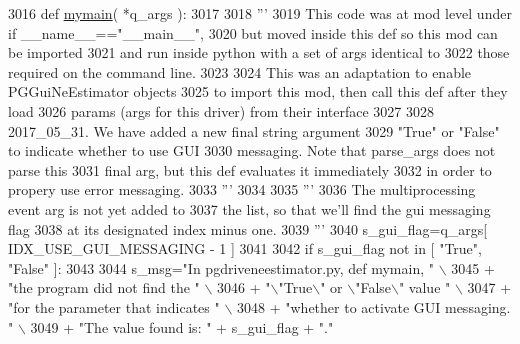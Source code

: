 \begin{DoxyCode}
3016 \textcolor{keyword}{def }\hyperlink{namespacenegui_1_1pgdriveneestimator_a8344146a59d84da02da349abd68723ad}{mymain}( *q\_args ):
3017 
3018     \textcolor{stringliteral}{'''}
3019 \textcolor{stringliteral}{    This code was at mod level under if \_\_name\_\_=="\_\_main\_\_",}
3020 \textcolor{stringliteral}{    but moved inside this def so this mod can be imported}
3021 \textcolor{stringliteral}{    and run inside python with a set of args identical to}
3022 \textcolor{stringliteral}{    those required on the command line.}
3023 \textcolor{stringliteral}{}
3024 \textcolor{stringliteral}{    This was an adaptation to enable PGGuiNeEstimator objects}
3025 \textcolor{stringliteral}{    to import this mod, then call this def after they load }
3026 \textcolor{stringliteral}{    params (args for this driver) from their interface}
3027 \textcolor{stringliteral}{    }
3028 \textcolor{stringliteral}{    2017\_05\_31. We have added a new final string argument}
3029 \textcolor{stringliteral}{    "True" or "False" to indicate whether to use GUI}
3030 \textcolor{stringliteral}{    messaging. Note that parse\_args does not parse this}
3031 \textcolor{stringliteral}{    final arg, but this def evaluates it immediately}
3032 \textcolor{stringliteral}{    in order to propery use error messaging.}
3033 \textcolor{stringliteral}{    '''}
3034 
3035     \textcolor{stringliteral}{'''}
3036 \textcolor{stringliteral}{    The multiprocessing event arg is not yet added to }
3037 \textcolor{stringliteral}{    the list, so that we'll find the gui messaging flag}
3038 \textcolor{stringliteral}{    at its designated index minus one.}
3039 \textcolor{stringliteral}{    '''}
3040     s\_gui\_flag=q\_args[ IDX\_USE\_GUI\_MESSAGING - 1 ]
3041 
3042     \textcolor{keywordflow}{if} s\_gui\_flag \textcolor{keywordflow}{not} \textcolor{keywordflow}{in} [ \textcolor{stringliteral}{"True"}, \textcolor{stringliteral}{"False"} ]:
3043 
3044         s\_msg=\textcolor{stringliteral}{"In pgdriveneestimator.py, def mymain, "} \(\backslash\)
3045                         + \textcolor{stringliteral}{"the program did not find the "} \(\backslash\)
3046                         + \textcolor{stringliteral}{"\(\backslash\)"True\(\backslash\)" or \(\backslash\)"False\(\backslash\)" value "} \(\backslash\)
3047                         + \textcolor{stringliteral}{"for the parameter that indicates "} \(\backslash\)
3048                         + \textcolor{stringliteral}{"whether to activate GUI messaging.  "} \(\backslash\)
3049                         + \textcolor{stringliteral}{"The value found is: "} + s\_gui\_flag + \textcolor{stringliteral}{"."}

\end{DoxyCode}
